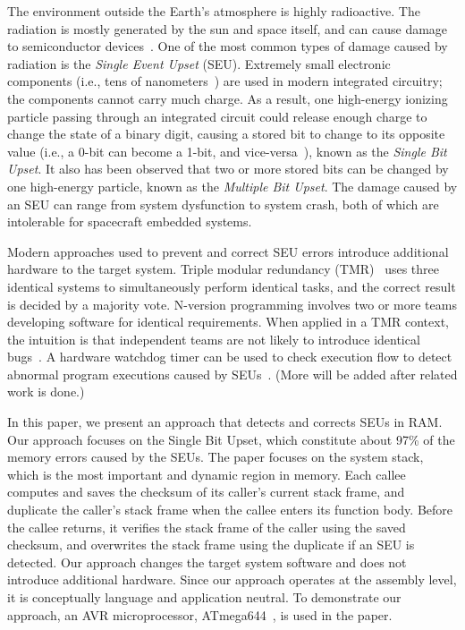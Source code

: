 The environment outside the Earth's atmosphere is highly radioactive. The radiation is mostly generated by the sun and space itself, and can cause damage to semiconductor devices~\cite[p.636]{fundamentals:space}. One of the most common types of damage caused by radiation is the \textit{Single Event Upset} (SEU). Extremely small electronic components (i.e., tens of nanometers~\cite{intel:chip:size}) are used in modern integrated circuitry; the components cannot carry much charge. As a result, one high-energy ionizing particle passing through an integrated circuit could release enough charge to change the state of a binary digit, causing a stored bit to change to its opposite value (i.e., a 0-bit can become a 1-bit, and vice-versa~\cite[p.637]{fundamentals:space}), known as the \textit{Single Bit Upset}. It also has been observed that two or more stored bits can be changed by one high-energy particle, known as the \textit{Multiple Bit Upset}. The damage caused by an SEU can range from system dysfunction to system crash, both of which are intolerable for spacecraft embedded systems.

Modern approaches used to prevent and correct SEU errors introduce additional hardware to the target system. Triple modular redundancy (TMR)~\cite[p.645]{fundamentals:space} uses three identical systems to simultaneously perform identical tasks, and the correct result is decided by a majority vote. N-version programming involves two or more teams developing software for identical requirements. When applied in a TMR context, the intuition is that independent teams are not likely to introduce identical bugs~\cite[p.646]{fundamentals:space}. A hardware watchdog timer can be used to check execution flow to detect abnormal program executions caused by SEUs~\cite[p.648]{fundamentals:space}. (More will be added after related work is done.)

In this paper, we present an approach that detects and corrects SEUs in RAM. Our approach focuses on the Single Bit Upset, which constitute about 97\% of the memory errors caused by the SEUs. The paper focuses on the system stack, which is the most important and dynamic region in memory. Each callee computes and saves the checksum of its caller's current stack frame, and duplicate the caller's stack frame when the callee enters its function body. Before the callee returns, it verifies the stack frame of the caller using the saved checksum, and overwrites the stack frame using the duplicate if an SEU is detected. Our approach changes the target system software and does not introduce additional hardware. Since our approach operates at the assembly level, it is conceptually language and application neutral. To demonstrate our approach, an AVR microprocessor, ATmega644~\cite{atmel:avr}, is used in the paper. 

